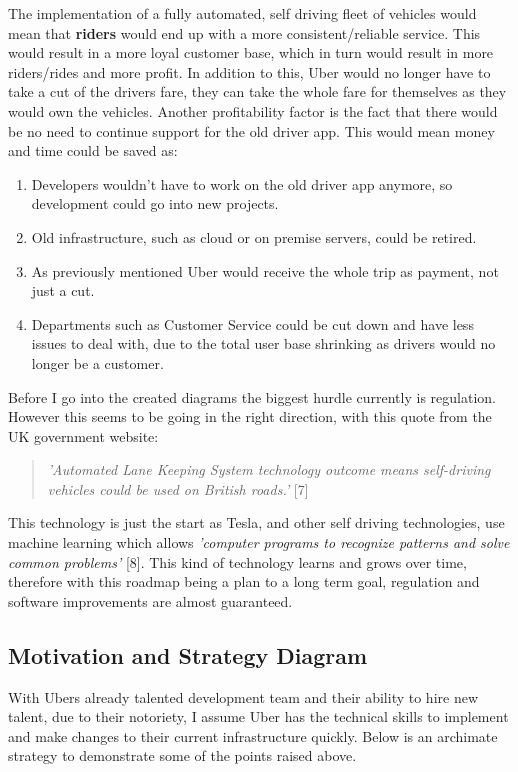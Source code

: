 \documentclass{article}
\begin{document}
    The implementation of a fully automated, self driving fleet of vehicles would mean that \textbf{riders} would end up 
    with a more consistent/reliable service. This would result in a more loyal customer base, which in turn would result in
    more riders/rides and more profit. In addition to this, Uber would no longer have to take a cut of the drivers fare, they
    can take the whole fare for themselves as they would own the vehicles. Another profitability factor is the fact that there
    would be no need to continue support for the old driver app. This would mean money and time could be saved as:

    \begin{enumerate}
      \item Developers wouldn't have to work on the old driver app anymore, so development could go into new projects.
      \item Old infrastructure, such as cloud or on premise servers, could be retired.
      \item As previously mentioned Uber would receive the whole trip as payment, not just a cut.
      \item Departments such as Customer Service could be cut down and have less issues to deal with, due to the total user base shrinking as drivers would no longer be a customer.
    \end{enumerate} 

    Before I go into the created diagrams the biggest hurdle currently is regulation. However this seems to be going in the right direction, with this quote from the UK government website:
    \begin{quote}
      \textit{'Automated Lane Keeping System technology outcome means self-driving vehicles could be used on British roads.'} [7]
    \end{quote}
    This technology is just the start as Tesla, and other self driving technologies, use machine learning which allows \textit{'computer programs to recognize patterns and solve common problems'} [8].
    This kind of technology learns and grows over time, therefore with this roadmap being a plan to a long term goal, regulation and software improvements are almost guaranteed.

    \newpage
    \subsection{Motivation and Strategy Diagram}

    \noindent  With Ubers already talented development team and their ability to hire new talent, due to their notoriety, I assume Uber has 
    the technical skills to implement and make changes to their current infrastructure quickly. Below is an archimate strategy to demonstrate some of
    the points raised above. 
\end{document}

